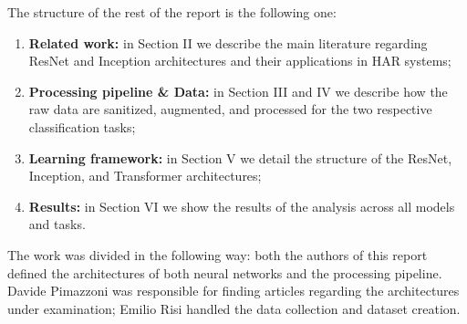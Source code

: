 The structure of the rest of the report is the following one:
\begin{enumerate}
    \item \textbf{Related work:} in Section II we describe the main literature regarding ResNet and Inception architectures and their applications in HAR systems;
    \item \textbf{Processing pipeline \& Data:} in Section III and IV we describe how the raw data are sanitized, augmented, and processed for the two respective classification tasks;
    \item \textbf{Learning framework:} in Section V we detail the structure of the ResNet, Inception, and Transformer architectures;
    \item \textbf{Results:} in Section VI we show the results of the analysis across all models and tasks.
\end{enumerate}

The work was divided in the following way: both the authors of this report defined the architectures of both neural networks and the processing pipeline. Davide Pimazzoni was responsible for finding articles regarding the architectures under examination; Emilio Risi handled the data collection and dataset creation.
